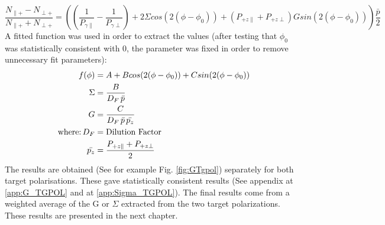 \begin{equation}
  \frac{N_{\parallel +} - N_{\perp +}}{N_{\parallel +} + N_{\perp +}} = \left( (\frac{1}{P_{\gamma \parallel}} - \frac{1}{P_{\gamma \perp}}) + 2 \Sigma cos(2(\phi-\phi_0)) +  (P_{+z\parallel}+P_{+z\perp}) G sin(2(\phi-\phi_0)) \right) \frac{\bar{p}}{2} \label{eq:A2}
\end{equation}
A fitted function was used in order to extract the values (after testing that $\phi_0$ was statistically consistent with 0, the parameter was fixed in order to remove unnecessary fit parameters):
\begin{align}
  f(\phi) & = A + B cos(2(\phi-\phi_0)) + C sin(2(\phi-\phi_0)) \\
  \Sigma & = \frac{B}{D_F \, \bar{p}} \\
  G & = \frac{C}{D_F \, \bar{p} \,\bar{p_z}} \\
    \textnormal{where:} \, D_F & =   \textnormal{Dilution Factor} \\
    \bar{p_z} & =  \frac{P_{+z\parallel}+P_{+z\perp}}{2}
\end{align}
The results are obtained (See for example Fig. \ref{fig:GTgpol}) separately for both target polarisations. These gave statistically consistent results (See appendix at \ref{app:G_TGPOL} and at \ref{app:Sigma_TGPOL}). The final results come from a weighted average of the G or $\Sigma$ extracted from the two target polarizations. These results are presented in the next chapter.



